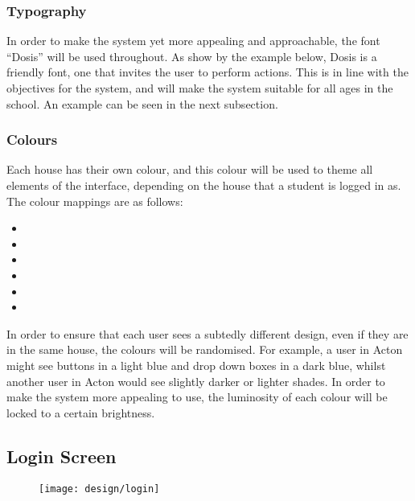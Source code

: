 \subsubsection{Typography}
In order to make the system yet more appealing and approachable, the font ``Dosis'' will be used throughout. As show by the example below, Dosis is a friendly font, one that invites the user to perform actions. This is in line with the objectives for the system, and will make the system suitable for all ages in the school. An example can be seen in the next subsection.

\subsubsection{Colours}
Each house has their own colour, and this colour will be used to theme all elements of the interface, depending on the house that a student is logged in as. The colour mappings are as follows:

\begin{itemize}[leftmargin=*]
  \item \dosis{\textcolor{specialblue}{Acton (Blue)}}
  \item \dosis{\textcolor{specialorange}{Baxter (Orange)}}
  \item \dosis{\textcolor{specialturquoise}{Clive (Turqoise)}}
  \item \dosis{\textcolor{specialpurple}{Darwin (Purple)}}
  \item \dosis{\textcolor{specialred}{Houseman (Red)}}
  \item \dosis{\textcolor{specialyellow}{Webb (Yellow)}}
\end{itemize}

In order to ensure that each user sees a subtedly different design, even if they are in the same house, the colours will be randomised. For example, a user in Acton might see buttons in a light blue and drop down boxes in a dark blue, whilst another user in Acton would see slightly darker or lighter shades. In order to make the system more appealing to use, the luminosity of each colour will be locked to a certain brightness.

\subsection{Login Screen}
\begin{figure}[h!]
  \texttt{[image: design/login]}
\end{figure}

